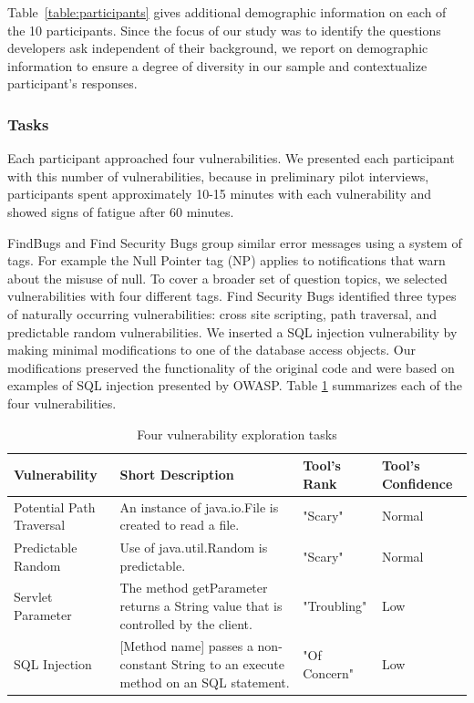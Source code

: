 \documentclass[conference]{IEEEtran}
\begin{document}
Table~\ref{table:participants} gives additional demographic information on each of the 10 participants. 
Since the focus of our study was to identify the questions developers ask independent of their background, we report on demographic information to ensure a degree of diversity in our sample and contextualize participant's responses.

\subsubsection{Tasks}
Each participant approached four vulnerabilities. 
We presented each participant with this number of vulnerabilities, because in preliminary pilot interviews, participants spent approximately 10-15 minutes with each vulnerability and showed signs of fatigue after 60 minutes.

FindBugs and Find Security Bugs group similar error messages using a system of tags. For example the Null Pointer tag (NP) applies to notifications that warn about the misuse of null. To cover a broader set of question topics, we selected vulnerabilities with four different tags.
Find Security Bugs identified three types of naturally occurring vulnerabilities: cross site scripting, path traversal, and predictable random vulnerabilities.
We inserted a SQL injection vulnerability by making minimal modifications to one of the database access objects.
Our modifications preserved the functionality of the original code and were based on examples of SQL injection presented by OWASP.
Table \ref{table:vulnerabilities} summarizes each of the four vulnerabilities. 

\begin{table} 
\centering
\caption{Four vulnerability exploration tasks}
\begin{tabular}{|l|l|l|l|}
\rowcolor{gray!50}
\hline
    Vulnerability				& Short Description													& Tool's Rank 						& Tool's Confidence\\
    \hline	
    Potential Path Traversal	& An instance of java.io.File is created to read a file.     			& "Scary"							 	&  Normal\\
    \hline
    Predictable Random			& Use of java.util.Random is predictable. 								& "Scary"								&  Normal\\
    \hline
    Servlet Parameter 			& The method getParameter returns a String value that is controlled by the client.			& "Troubling"		&  Low\\
    \hline
    SQL Injection				& [Method name] passes a non-constant String to an execute method on an SQL statement.     	& "Of Concern"		&  Low\\
    \hline
\end{tabular}
\label{table:vulnerabilities}
\end{table}
\end{document}
